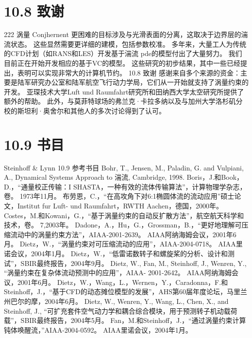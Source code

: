 \documentclass[UTF8,11pt,a4paper,openany,fontset=fandol]{ctexbook}
\begin{document}
\section{10.8 致谢}
222 涡量 Conjhernent 更困难的目标涉及与光滑表面的分离，这取决于边界层的湍流状态。 这些显然需要更详细的建模，包括参数校准。 多年来，大量工人为传统的CFD计划（如RANS和LES）开发基于湍流 pde的模型付出了大量努力。 我们目前正在开始开发相应的基于VC的模型。 这些研究的初步结果，其中一些已经提出，表明可以实现非常大的计算机节约。 10.8 致谢 感谢来自多个来源的资金：主要是陆军研究办公室和陆军航空飞行动力学局，它们从一开始就支持了涡量约束的开发。 亚琛技术大学Luft und Raumfahrt研究所和田纳西大学太空研究所提供了额外的帮助。 此外，与莫菲特球场的弗兰克·卡拉多纳以及与加州大学洛杉矶分校的斯坦利·奥舍尔和其他人的多次讨论得到了认可。

\section{10.9 书目}
Steinhoff \& Lynn 10.9 参考书目 Bohr, T., Jensen, M., Paladin, G. and Vulpiani, A., Dynamical Systems Approach to 湍流, Cambridge, 1998. Boris，J.和Book，D.，“通量校正传输：I SHASTA，一种有效的流体传输算法”，计算物理学杂志，卷。 1973年11月。 布劳恩，C.，“在高攻角下对6:1椭圆体流的流动应用”硕士论文，Institut fur Luft- und Raumfahrt，RWTH Aachen，德国，2000年。 Costes，M.和Kowani，G.，“基于涡量约束的自动反扩散方法”，航空航天科学和技术，卷。 7,2003年。 Dadone，A.，Hu，G.，Grossman，B.，“更好地理解可压缩流动中的涡量约束方法”，AIAA-2001-2639。 AIAA阿纳海姆会议，2001年6月。 Dietz，W.，“涡量约束对可压缩流动的应用”，AIAA-2004-0718。 AIAA里诺会议，2004年1月。 Dietz，W.，“低雷诺数转子和螺旋桨的分析、设计和测试”，SBIR最终报告，2004年9月。 Dietz, W., Fan, M., Steinhoff, J., Wenren, Y., “涡量约束在复杂体流动预测中的应用”，AIAA- 2001-2642。 AIAA阿纳海姆会议，2001年6月。 Dietz，W.，Wang，L.，Wernen，Y.，Caradonna，F.和Steinhoff，J.，“基于CFD的动态摊位模型的发展”，AHS第60届年度论坛，马里兰州巴尔的摩，2004年6月。 Dietz, W., Wenren, Y., Wang, L., Chen, X., and Steinhoff, J., “可扩充套件空气动力学和耦合综合模块，用于预测转子机动载荷载”，SBIR最终报告，2004年5月。 Fan，M.和Steinhoff，J.，“通过涡量约束计算钝体唤醒流，”AIAA-2004-0592。 AIAA里诺会议，2004年1月。
\end{document}
